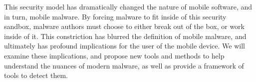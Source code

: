 This security model has dramatically changed the nature of mobile software, and in turn, mobile malware. By forcing malware to fit inside of this security sandbox, malware authors must choose to either break out of the box, or work inside of it. This constriction has blurred the definition of mobile malware, and ultimately has profound implications for the user of the mobile device. We will examine these implications, and propose new tools and methods to help understand the nuances of modern malware, as well as provide a framework of tools to detect them.

